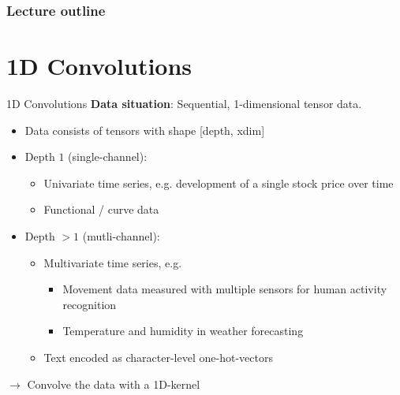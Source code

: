 

 








\begin{frame}
\frametitle{Lecture outline}
\tableofcontents
\end{frame}


\section{1D Convolutions}

\begin{vbframe}{1D Convolutions}
\textbf{Data situation}: Sequential, 1-dimensional tensor data. 

\begin{itemize}
\item Data consists of tensors with shape [depth, xdim]
\item Depth $1$ (single-channel):
    \begin{itemize}
        \item Univariate time series, e.g. development of a single stock price over time
        \item Functional / curve data
    \end{itemize}
\item Depth $> 1$ (mutli-channel):
    \begin{itemize}
        \item Multivariate time series, e.g.
        \begin{itemize}
            \item Movement data measured with multiple sensors for human activity recognition
            \item Temperature and humidity in weather forecasting
        \end{itemize}
        \item Text encoded as character-level one-hot-vectors 
    \end{itemize}
\end{itemize}

$\to$ Convolve the data with a 1D-kernel

\end{vbframe}

